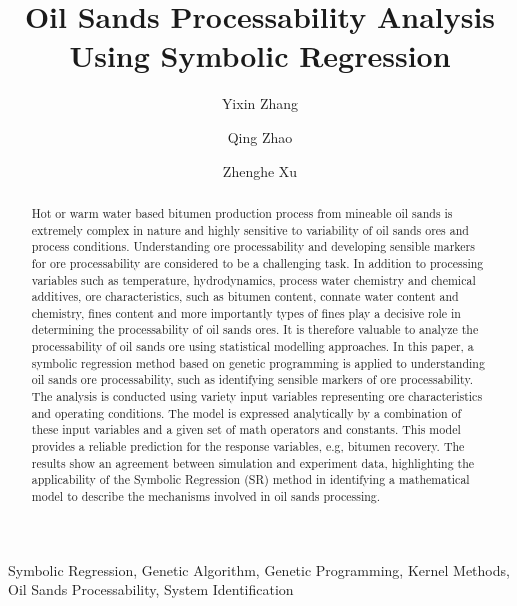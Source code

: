 \documentclass[final,5p,times,twocolumn]{elsarticle}
\begin{document}
\begin{frontmatter}

\title{Oil Sands Processability Analysis Using Symbolic Regression}


\author[label1,label2,label5]{Yixin Zhang}
\address[label1]{Dept. of Electrical and Computer Engineering}
\address[label2]{Dept. of Chemical and Material Engineering}



\author[label1,label5]{Qing Zhao}
\address[label5]{University of Alberta}

\author[label2,label5]{Zhenghe Xu}




\begin{abstract}
Hot or warm water based bitumen production process from mineable oil sands is extremely complex in nature and highly sensitive to variability of oil sands ores and process conditions. Understanding ore processability and developing sensible markers for ore processability are considered to be a challenging task. In addition to processing variables such as temperature, hydrodynamics, process water chemistry and chemical additives, ore characteristics, such as bitumen content, connate water content and chemistry, fines content and more importantly types of fines play a decisive role in determining the processability of oil sands ores. It is therefore valuable to analyze the processability of oil sands ore using statistical modelling approaches. In this paper, a symbolic regression method based on genetic programming is applied to understanding oil sands ore processability, such as identifying sensible markers of ore processability. The analysis is conducted using variety input variables representing ore characteristics and operating conditions. The model is expressed analytically by a combination of these input variables and a given set of math operators and constants. This model provides a reliable prediction for the response variables, e.g, bitumen recovery. The results show an agreement between simulation and experiment data, highlighting the applicability of the Symbolic Regression (SR) method in identifying a mathematical model to describe the mechanisms involved in oil sands processing. 
\end{abstract}

\begin{keyword}
Symbolic Regression, Genetic Algorithm, Genetic Programming, Kernel Methods, Oil Sands Processability, System Identification
\end{keyword}

\end{frontmatter}
\end{document}
